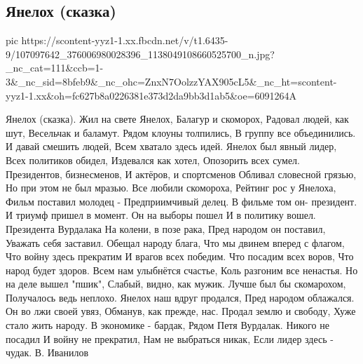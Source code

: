 
 
 
 
 

\subsection{Янелох (сказка)}
\label{sec:02_07_2020.fb.1.ja_ne_loh}

\ifcmt
  pic https://scontent-yyz1-1.xx.fbcdn.net/v/t1.6435-9/107097642_376006980028396_1138049108660525700_n.jpg?_nc_cat=111&ccb=1-3&_nc_sid=8bfeb9&_nc_ohc=ZnxN7OolzzYAX905cL5&_nc_ht=scontent-yyz1-1.xx&oh=fc627b8a0226381e373d2da9bb3d1ab5&oe=6091264A
\fi

Янелох (сказка).
Жил на свете Янелох,
Балагур и скоморох,
Радовал людей, как шут, 
Весельчак и баламут.
Рядом клоуны толпились,
В группу все объединились.
И давай смешить людей,
Всем хватало здесь идей.
Янелох был явный лидер,
Всех политиков обидел,
Издевался как хотел,
Опозорить всех сумел.
Президентов, бизнесменов,
И актёров, и спортсменов
Обливал словесной грязью,
Но при этом не был мразью.
Все любили скомороха,
Рейтинг рос у Янелоха,
Фильм поставил молодец -
Предприимчивый делец.
В фильме том он- президент.
И триумф пришел в момент.
Он на выборы пошел
И в политику вошел.
Президента Вурдалака 
На колени, в позе рака,
Пред народом он поставил,
Уважать себя заставил.
Обещал народу блага,
Что мы двинем вперед с флагом,
Что войну здесь прекратим
И врагов всех победим.
Что посадим всех воров,
Что народ будет здоров.
Всем нам улыбнётся счастье,
Коль разгоним все ненастья.
Но на деле вышел "пшик",
Слабый, видно, как мужик.
Лучше был бы скомарохом,
Получалось ведь неплохо.
Янелох наш вдруг продался,
Пред народом облажался.
Он во лжи своей увяз,
Обманув, как прежде, нас.
Продал землю и свободу,
Хуже стало жить народу.
В экономике - бардак,
Рядом Петя Вурдалак.
Никого не посадил
И войну не прекратил,
Нам не выбраться никак,
Если лидер здесь - чудак.
В. Иванилов


